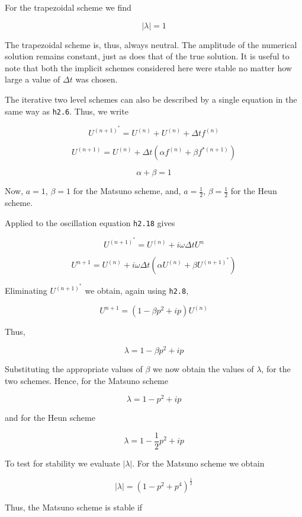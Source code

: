 For the trapezoidal scheme we find

{\[| \lambda | = 1\]}

The trapezoidal scheme is, thus, always neutral. The amplitude of the
numerical solution remains constant, just as does that of the true
solution. It is useful to note that both the implicit schemes considered
here were stable no matter how large a value of \(\Delta t\) was chosen.

The iterative two level schemes can also be described by a single
equation in the same way as \texttt{h2.6}. Thus, we write

\[U^{\left( n + 1 \right)^{*}} = U^{\left( n \right)} + U^{\left( n \right)} + \Delta t{ f}^{\left( n \right)}\]

{\[U^{\left( n + 1 \right)} = U^{\left( n \right)} + \Delta t\left( \alpha f^{\left( n \right)} + \beta f^{*\left( n + 1 \right)} \right)\]}

\[\alpha + \beta = 1\]

Now, \(a = 1\), \(\beta = 1\) for the Matsuno scheme, and,
\(a = \frac{1}{2}\), \(\beta = \frac{1}{2}\) for the Heun scheme.

Applied to the oscillation equation \texttt{h2.18} gives

{\[U^{\left( n + 1 \right)^{*}} = U^{\left( n \right)} + i\omega \Delta t U^n\]}

\[U^{n + 1} = U^{\left( n \right)} + i\omega\Delta t\left( \alpha U^{\left( n \right)} + \beta U^{\left( n + 1 \right)^{*}} \right)\]

Eliminating \(U^{\left( n + 1 \right)^{*}}\) we obtain, again using
\texttt{h2.8},

\[U^{n + 1} = \left( 1 - \beta p^{2} + ip \right)U^{\left( n \right)}\]

Thus,

{\[\lambda = 1 - \beta p^{2} + ip\]}

Substituting the appropriate values of \(\beta\) we now obtain the
values of \(\lambda\), for the two schemes. Hence, for the Matsuno
scheme

{\[\lambda = 1 - p^{2} + ip\]}

and for the Heun scheme

{\[\lambda = 1 - \frac{1}{2}p^{2} + i p\]}

To test for stability we evaluate \(| \lambda |\). For the Matsuno
scheme we obtain

{\[| \lambda | = \left( 1 - p^{2} + p^{4} \right)^{\frac{1}{2}}\]}

Thus, the Matsuno scheme is stable if

